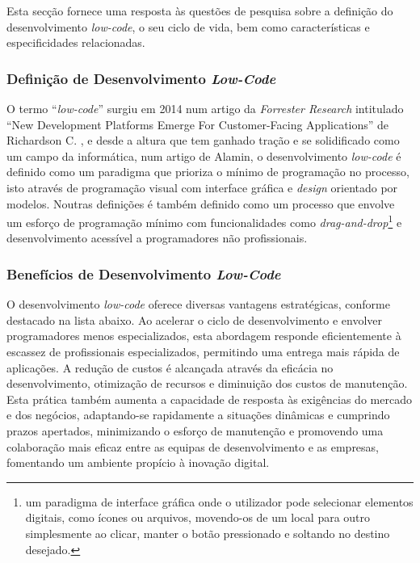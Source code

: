         Esta secção fornece uma resposta às questões de pesquisa sobre a definição do desenvolvimento \textit{low-code}, o seu ciclo de vida, bem como características e especificidades relacionadas.

        \subsubsection{Definição de Desenvolvimento \textit{Low-Code}}\label{secsec:defining_low-code}

            O termo ``\textit{low-code}'' surgiu em 2014 num artigo da \textit{Forrester Research} intitulado ``New Development Platforms Emerge For Customer-Facing Applications'' de Richardson C. \cite{bock2021lowcode,sanchis2020lowcode,bucaioni2022modelling,diruscio2022lowcode}, e desde a altura que tem ganhado tração e se solidificado como um campo da informática, num artigo de Alamin, \cite{alamin2021empirical} o desenvolvimento \textit{low-code} é definido como um paradigma que prioriza o mínimo de programação no processo, isto através de programação visual com interface gráfica e \textit{design} orientado por modelos. Noutras definições é também definido como um processo que envolve um esforço de programação mínimo com funcionalidades como \textit{drag-and-drop}\footnote{um paradigma de interface gráfica onde o utilizador pode selecionar elementos digitais, como ícones ou arquivos, movendo-os de um local para outro simplesmente ao clicar, manter o botão pressionado e soltando no destino desejado.} e desenvolvimento acessível a programadores não profissionais\cite{rokis2023exploring}.

        \subsubsection{Benefícios de Desenvolvimento \textit{Low-Code}}\label{secsec:beneficios_low-code}

            O desenvolvimento \textit{low-code} oferece diversas vantagens estratégicas, conforme destacado na lista abaixo. Ao acelerar o ciclo de desenvolvimento e envolver programadores menos especializados, esta abordagem responde eficientemente à escassez de profissionais especializados, permitindo uma entrega mais rápida de aplicações. A redução de custos é alcançada através da eficácia no desenvolvimento, otimização de recursos e diminuição dos custos de manutenção. Esta prática também aumenta a capacidade de resposta às exigências do mercado e dos negócios, adaptando-se rapidamente a situações dinâmicas e cumprindo prazos apertados, minimizando o esforço de manutenção e promovendo uma colaboração mais eficaz entre as equipas de desenvolvimento e as empresas, fomentando um ambiente propício à inovação digital\cite{rokis2023exploring,yan2021impacts}.

